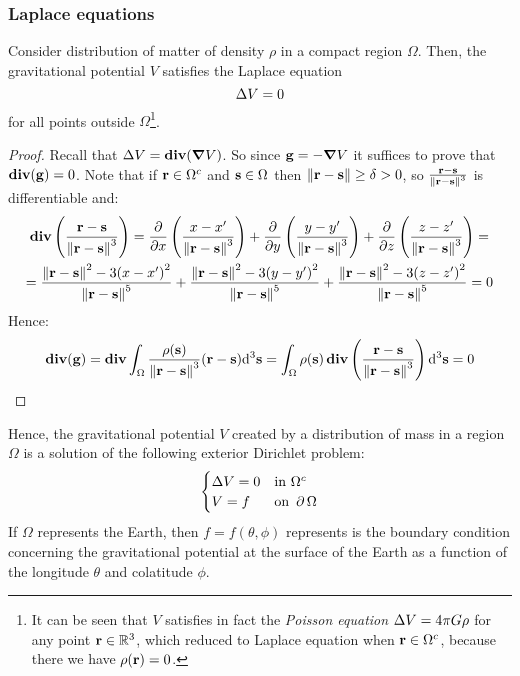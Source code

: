 \documentclass[../main.tex]{subfiles}
\begin{document}
\subsubsection{Laplace equations}
\begin{theorem}
  Consider distribution of matter of density $\rho$ in a compact region $\Omega$. Then, the gravitational potential $V$ satisfies the Laplace equation
  \begin{equation}
    \laplacian V = 0
  \end{equation}
  for all points outside $\Omega$\footnote{It can be seen that $V$ satisfies in fact the \emph{Poisson equation} $\laplacian V=4\pi G\rho$ for any point $\vf{r}\in\RR^3$, which reduced to Laplace equation when $\vf{r}\in\Omega^c$, because there we have $\rho(\vf{r})=0$.}.
\end{theorem}
\begin{proof}
  Recall that $\laplacian V=\div(\grad V)$. So since $\vf{g}=-\grad V$ it suffices to prove that $\div(\vf{g})=0$. Note that if $\vf{r}\in\Omega^c$ and $\vf{s}\in\Omega$ then $\norm{\vf{r}-\vf{s}}\geq\delta>0$, so $\frac{\vf{r}-\vf{s}}{\norm{\vf{r}-\vf{s}}^3}$ is differentiable and:
  \begin{multline*}
    \div\left(\frac{\vf{r}-\vf{s}}{\norm{\vf{r}-\vf{s}}^3}\right)=\pdv{}{x}\left(\frac{x-x'}{\norm{\vf{r}-\vf{s}}^3}\right)+\pdv{}{y}\left(\frac{y-y'}{\norm{\vf{r}-\vf{s}}^3}\right)+\pdv{}{z}\left(\frac{z-z'}{\norm{\vf{r}-\vf{s}}^3}\right)=\\
    =\frac{\norm{\vf{r}-\vf{s}}^2-3{(x-x')}^2}{\norm{\vf{r}-\vf{s}}^5}+\frac{\norm{\vf{r}-\vf{s}}^2-3{(y-y')}^2}{\norm{\vf{r}-\vf{s}}^5}+\frac{\norm{\vf{r}-\vf{s}}^2-3{(z-z')}^2}{\norm{\vf{r}-\vf{s}}^5} =0
  \end{multline*}
  Hence:
  \begin{equation}
    \div(\vf{g})=\div\int_\Omega\frac{\rho(\vf{s})}{\norm{\vf{r}-\vf{s}}^3}(\vf{r}-\vf{s})\dd^3{\vf{s}}=\int_\Omega\rho(\vf{s})\div\left(\frac{\vf{r}-\vf{s}}{\norm{\vf{r}-\vf{s}}^3}\right)\dd^3{\vf{s}}=0
  \end{equation}
\end{proof}
Hence, the gravitational potential $V$ created by a distribution of mass in a region $\Omega$ is a solution of the following exterior Dirichlet problem:
\begin{equation}
  \begin{cases}
    \laplacian V = 0 & \text{in } \Omega^c    \\
    V = f            & \text{on } \Fr{\Omega}
  \end{cases}
\end{equation}
If $\Omega$ represents the Earth, then $f=f(\theta,\phi)$ represents is the boundary condition concerning the gravitational potential at the surface of the Earth as a function of the longitude $\theta$ and colatitude $\phi$.
\end{document}

